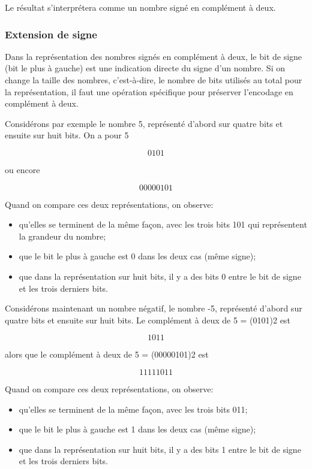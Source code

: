 \documentclass[11pt]{article}
\begin{document}
Le résultat s'interprétera comme un nombre signé en complément à deux. 

\subsubsection{Extension de signe}
\label{sec:org3953ab1}

Dans la représentation des nombres signés en complément à deux, le bit
de signe (bit le plus à gauche) est une indication directe du signe
d'un nombre. Si on change la taille des nombres, c'est-à-dire, le nombre
de bits utilisés au total pour la représentation, il faut une
opération spécifique pour préserver l'encodage en complément à deux. 

Considérons par exemple le nombre 5, représenté d'abord sur quatre
bits et ensuite sur huit bits. On a pour 5 

$$ 0101 $$

ou encore 

$$ 00000101 $$

Quand on compare ces deux représentations, on observe: 

\begin{itemize}
\item qu'elles se terminent de la même façon, avec les trois bits 101 qui
représentent la grandeur du nombre;
\item que le bit le plus à gauche est 0 dans les deux cas (même signe);
\item que dans la représentation sur huit bits, il y a des bits 0 entre le bit
de signe et les trois derniers bits.
\end{itemize}

Considérons maintenant un nombre négatif, le nombre -5, représenté
d'abord sur quatre bits et ensuite sur huit bits. Le complément à deux
de 5 = (0101)2 est

$$ 1011 $$

alors que le complément à deux de 5 = (00000101)2 est

$$ 11111011 $$

Quand on compare ces deux représentations, on observe: 

\begin{itemize}
\item qu'elles se terminent de la même façon, avec les trois bits 011;
\item que le bit le plus à gauche est 1 dans les deux cas (même signe);
\item que dans la représentation sur huit bits, il y a des bits 1 entre le bit
de signe et les trois derniers bits.
\end{itemize}
\end{document}
